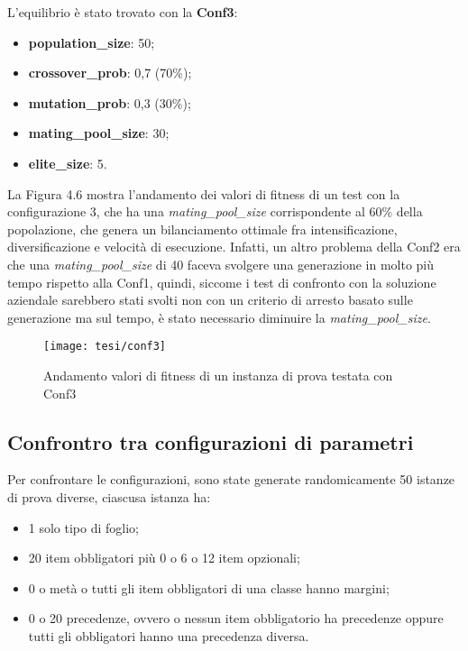 \noindent L'equilibrio è stato trovato con la \textbf{Conf3}:
\begin{itemize}
	\item\textbf{population\_size}: 50;
	\item\textbf{crossover\_prob}: 0,7 (70\%);
	\item\textbf{mutation\_prob}: 0,3 (30\%);
	\item\textbf{mating\_pool\_size}: 30;
	\item\textbf{elite\_size}: 5.
\end{itemize}

La Figura 4.6 mostra l'andamento dei valori di fitness di un test con la configurazione 3, che ha una \emph{mating\_pool\_size} corrispondente al 60\% della popolazione, che genera un bilanciamento ottimale fra intensificazione, diversificazione e velocità di esecuzione. Infatti, un altro problema della Conf2 era che una \emph{mating\_pool\_size} di 40 faceva svolgere una generazione in molto più tempo rispetto alla Conf1, quindi, siccome i test di confronto con la soluzione aziendale sarebbero stati svolti non con un criterio di arresto basato sulle generazione ma sul tempo, è stato necessario diminuire la \emph{mating\_pool\_size}.

\begin{figure}[!ht] 
    \centering 
    \texttt{[image: tesi/conf3]} 
    \caption{Andamento valori di fitness di un instanza di prova testata con Conf3}
\end{figure}

\subsection{Confrontro tra configurazioni di parametri} \hypertarget{ttest}{}

Per confrontare le configurazioni, sono state generate randomicamente 50 istanze di prova diverse, ciascusa istanza ha:
\begin{itemize}
	\item 1 solo tipo di foglio;
	\item 20 item obbligatori più 0 o 6 o 12 item opzionali;
	\item 0 o metà o tutti gli item obbligatori di una classe hanno margini;
	\item 0 o 20 precedenze, ovvero o nessun item obbligatorio ha precedenze oppure tutti gli obbligatori hanno una precedenza diversa.
\end{itemize}

